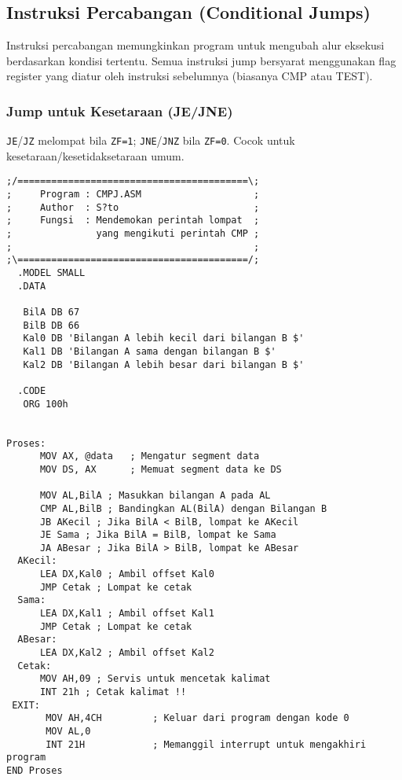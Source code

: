 \documentclass[../main.tex]{subfiles}
\begin{document}
        \subsection{Instruksi Percabangan (Conditional Jumps)}
            Instruksi percabangan memungkinkan program untuk mengubah alur eksekusi berdasarkan kondisi tertentu. Semua instruksi jump bersyarat menggunakan flag register yang diatur oleh instruksi sebelumnya (biasanya CMP atau TEST).

            \subsubsection{Jump untuk Kesetaraan (JE/JNE)}
\texttt{JE}/\texttt{JZ} melompat bila \texttt{ZF=1}; \texttt{JNE}/\texttt{JNZ} bila \texttt{ZF=0}. Cocok untuk kesetaraan/kesetidaksetaraan umum.

\begin{lstlisting}[language={[x86masm]Assembler}, caption=Program Perbandingan dengan Conditional Jumps, label={lst:je-jne}]
;/=========================================\; 
;     Program : CMPJ.ASM                    ; 
;     Author  : S?to                        ; 
;     Fungsi  : Mendemokan perintah lompat  ; 
;               yang mengikuti perintah CMP ; 
;                                           ; 
;\=========================================/; 
  .MODEL SMALL 
  .DATA
    
   BilA DB 67 
   BilB DB 66 
   Kal0 DB 'Bilangan A lebih kecil dari bilangan B $' 
   Kal1 DB 'Bilangan A sama dengan bilangan B $' 
   Kal2 DB 'Bilangan A lebih besar dari bilangan B $' 
  
  .CODE 
   ORG 100h 
 

Proses: 
      MOV AX, @data   ; Mengatur segment data
      MOV DS, AX      ; Memuat segment data ke DS
     
      MOV AL,BilA ; Masukkan bilangan A pada AL 
      CMP AL,BilB ; Bandingkan AL(BilA) dengan Bilangan B 
      JB AKecil ; Jika BilA < BilB, lompat ke AKecil 
      JE Sama ; Jika BilA = BilB, lompat ke Sama 
      JA ABesar ; Jika BilA > BilB, lompat ke ABesar 
  AKecil:
      LEA DX,Kal0 ; Ambil offset Kal0 
      JMP Cetak ; Lompat ke cetak 
  Sama: 
      LEA DX,Kal1 ; Ambil offset Kal1 
      JMP Cetak ; Lompat ke cetak 
  ABesar: 
      LEA DX,Kal2 ; Ambil offset Kal2 
  Cetak: 
      MOV AH,09 ; Servis untuk mencetak kalimat 
      INT 21h ; Cetak kalimat !! 
 EXIT: 
       MOV AH,4CH         ; Keluar dari program dengan kode 0
       MOV AL,0
       INT 21H            ; Memanggil interrupt untuk mengakhiri program 
END Proses
\end{lstlisting}
\end{document}
